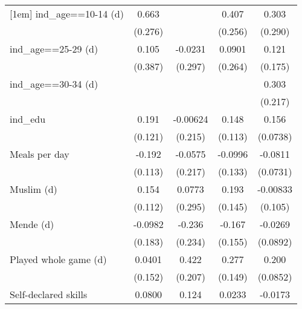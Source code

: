 {\begin{tabular}{l*{4}{c}}
[1em]
ind\_age==10-14 (d)  &       0.663\sym{**} &                     &       0.407         &       0.303         \\
                    &     (0.276)         &                     &     (0.256)         &     (0.290)         \\
[1em]
ind\_age==25-29 (d)  &       0.105         &     -0.0231         &      0.0901         &       0.121         \\
                    &     (0.387)         &     (0.297)         &     (0.264)         &     (0.175)         \\
[1em]
ind\_age==30-34 (d)  &                     &                     &                     &       0.303         \\
                    &                     &                     &                     &     (0.217)         \\
[1em]
ind\_edu             &       0.191         &    -0.00624         &       0.148         &       0.156\sym{**} \\
                    &     (0.121)         &     (0.215)         &     (0.113)         &    (0.0738)         \\
[1em]
Meals per day       &      -0.192\sym{*}  &     -0.0575         &     -0.0996         &     -0.0811         \\
                    &     (0.113)         &     (0.217)         &     (0.133)         &    (0.0731)         \\
[1em]
Muslim (d)          &       0.154         &      0.0773         &       0.193         &    -0.00833         \\
                    &     (0.112)         &     (0.295)         &     (0.145)         &     (0.105)         \\
[1em]
Mende (d)           &     -0.0982         &      -0.236         &      -0.167         &     -0.0269         \\
                    &     (0.183)         &     (0.234)         &     (0.155)         &    (0.0892)         \\
[1em]
Played whole game (d)&      0.0401         &       0.422\sym{**} &       0.277\sym{*}  &       0.200\sym{**} \\
                    &     (0.152)         &     (0.207)         &     (0.149)         &    (0.0852)         \\
[1em]
Self-declared skills&      0.0800         &       0.124         &      0.0233         &     -0.0173         \\

\end{tabular}}

